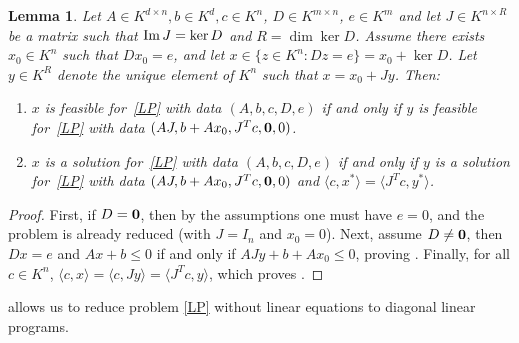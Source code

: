 \documentclass[sigconf]{acmart}
\newtheorem{lemma}[theorem]{Lemma}
\newcommand{\OK}{\mathcal{O}_K}
\begin{document}
\begin{lemma}\label{reducD}
  Let $A \in K^{d \times n}, b \in K^d, c\in K^n$, $D \in K^{m\times n}$,
  $e \in K^m$ and let $J \in K^{n \times R}$ be a matrix such that
  ${\rm Im}\, J = \ker D$ and $R = \dim \ker D$.
  Assume there exists $x_0 \in K^n$ such that $D x_0 = e$, and let
  $x \in \{z \in K^n : Dz = e\} = x_0 + \ker D$.
  Let $y \in K^R$ denote the unique element of $K^n$ such that
  $x = x_0 + J y$. Then:
  \begin{enumerate}
  \item\label{reducD_item1}
    $x$ is feasible for~\eqref{LP} with data $(A,b,c,D,e)$ if and only if 
    $y$ is feasible for~\eqref{LP} with data $(AJ,b+A x_0,J^T c,{\bf 0},0)$.
  \item\label{reducD_item2}
    $x$ is a solution for~\eqref{LP} with data $(A,b,c,D,e)$ if and only if 
    $y$ is a solution for~\eqref{LP} with data $(AJ,b+A x_0,J^T c,{\bf 0},0)$ and
    $\langle c,x^* \rangle = \langle J^T c,y^* \rangle$.
  \end{enumerate}
\end{lemma}
\begin{proof}
  First, if $D={\bf 0}$, then by the assumptions one must have $e=0$, and the problem
  is already reduced (with $J=I_n$ and $x_0=0$).
  Next, assume $D\neq{\bf 0}$, then $Dx=e$ and $Ax + b \le 0$ if and only if
  $AJy + b+Ax_0 \le 0$, proving . Finally, for all
  $c \in K^n$, $\langle c,x\rangle = \langle c, Jy\rangle = \langle J^T c,y\rangle$, which proves .
\end{proof}


 allows us to reduce problem \eqref{LP} without linear equations
to diagonal linear programs.
\end{document}
